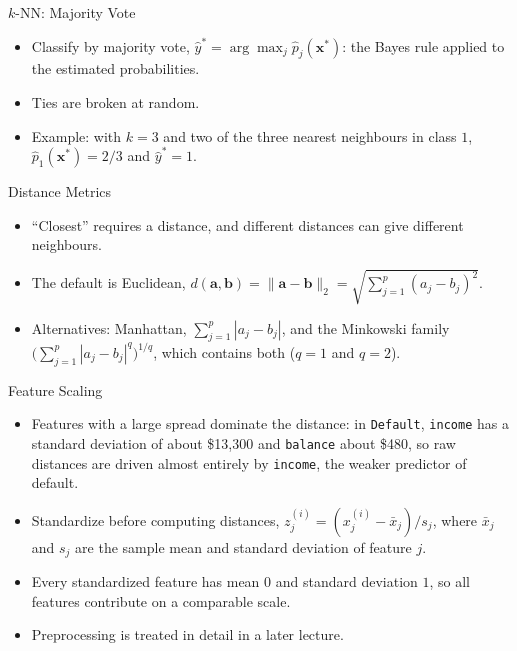 \begin{frame}{\texorpdfstring{$k$}{k}-NN: Majority Vote}
    \begin{itemize}
        \item Classify by majority vote, $\hat{y}^\ast = \arg\max_j \hat{p}_j(\mathbf{x}^\ast)$: the Bayes rule applied to the estimated probabilities.
        \item Ties are broken at random.
        \item Example: with $k = 3$ and two of the three nearest neighbours in class $1$, $\hat{p}_1(\mathbf{x}^\ast) = 2/3$ and $\hat{y}^\ast = 1$.
    \end{itemize}
\end{frame}


\begin{frame}{Distance Metrics}
    \begin{itemize}
        \item ``Closest'' requires a distance, and different distances can give different neighbours.
        \item The default is Euclidean, $d(\mathbf{a}, \mathbf{b}) = \lVert \mathbf{a} - \mathbf{b} \rVert_2 = \sqrt{\sum_{j=1}^{p} (a_j - b_j)^2}$.
        \item Alternatives: Manhattan, $\sum_{j=1}^{p} |a_j - b_j|$, and the Minkowski family $\big( \sum_{j=1}^{p} |a_j - b_j|^q \big)^{1/q}$, which contains both ($q = 1$ and $q = 2$).
    \end{itemize}
\end{frame}


\begin{frame}{Feature Scaling}
    \begin{itemize}
        \item Features with a large spread dominate the distance: in \texttt{Default}, \texttt{income} has a standard deviation of about \$13{,}300 and \texttt{balance} about \$480, so raw distances are driven almost entirely by \texttt{income}, the weaker predictor of default.
        \item Standardize before computing distances, $z_j^{(i)} = (x_j^{(i)} - \bar{x}_j) / s_j$, where $\bar{x}_j$ and $s_j$ are the sample mean and standard deviation of feature $j$.
        \item Every standardized feature has mean $0$ and standard deviation $1$, so all features contribute on a comparable scale.
        \item Preprocessing is treated in detail in a later lecture.
    \end{itemize}
\end{frame}


